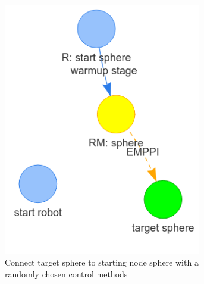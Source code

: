 \begin{figure}[H]
\ContinuedFloat
     \begin{subfigure}[b]{0.49\textwidth}
         \centering
         \includegraphics[width=0.95\textwidth]{figures/HGraph_example/2.png}
         \caption{Connect target sphere to starting node sphere with a randomly chosen control methods}
     \end{subfigure}
     \hfill
     \begin{subfigure}[b]{0.49\textwidth}
         \centering

\end{subfigure}
\end{figure}

